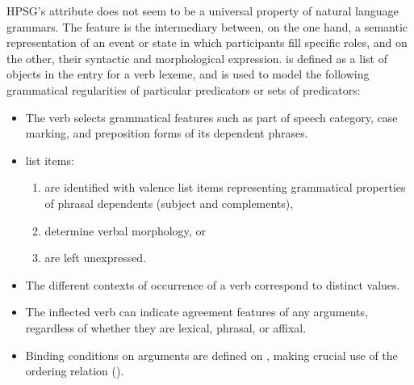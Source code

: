 \documentclass[output=paper,biblatex,babelshorthands,newtxmath,draftmode,colorlinks, citecolor=brown]{langscibook}
\begin{document}

HPSG's \argst attribute does not seem to be a universal property of natural
language grammars.  The \argst feature is the intermediary between, on
the one hand, a semantic representation of an event or state in which
participants fill specific roles, and on the other, their syntactic and
morphological expression.  \argst is defined as a list of 
objects in the entry for a verb lexeme, and is used to model the following grammatical regularities of particular predicators or sets of predicators:

\begin{itemize}
\item The verb selects grammatical features such as part of speech
category, case marking, and preposition forms of its dependent
phrases.
\item \argst list items:
\begin{enumerate}
\item are identified with valence list items
representing grammatical properties of phrasal dependents (subject and
complements),
\item determine verbal morphology, or
\item are left unexpressed.
\end{enumerate}
\item The different contexts of occurrence of a verb correspond to distinct \argst values.
\item The inflected verb can indicate agreement features of any arguments,
regardless of whether they are lexical, phrasal, or affixal.
\item Binding conditions on arguments are defined on \argst, making
crucial use of the ordering relation ().
\end{itemize}
\end{document}
